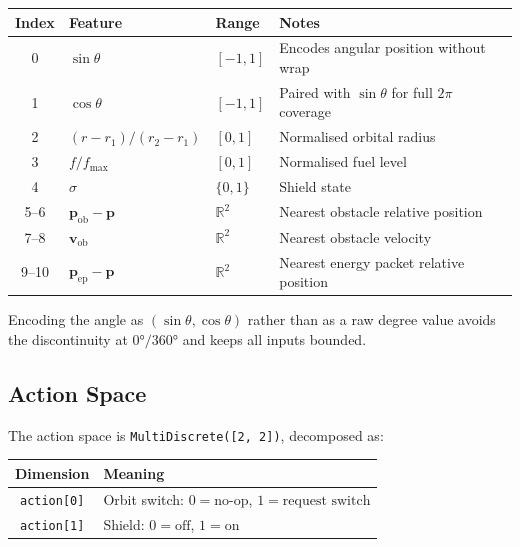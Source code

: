 \documentclass[12pt]{article}
\begin{document}
\begin{center}
    \renewcommand{\arraystretch}{1.3}
    \begin{tabular}{clll}
        \toprule
        Index & Feature                               & Range          & Notes                                             \\
        \midrule
        0     & $\sin\theta$                          & $[-1, 1]$      & Encodes angular position without wrap             \\
        1     & $\cos\theta$                          & $[-1, 1]$      & Paired with $\sin\theta$ for full $2\pi$ coverage \\
        2     & $(r - r_1)/(r_2 - r_1)$               & $[0, 1]$       & Normalised orbital radius                         \\
        3     & $f / f_{\max}$                        & $[0, 1]$       & Normalised fuel level                             \\
        4     & $\sigma$                              & $\{0, 1\}$     & Shield state                                      \\
        5--6  & $\mathbf{p}_{\text{ob}} - \mathbf{p}$ & $\mathbb{R}^2$ & Nearest obstacle relative position                \\
        7--8  & $\mathbf{v}_{\text{ob}}$              & $\mathbb{R}^2$ & Nearest obstacle velocity                         \\
        9--10 & $\mathbf{p}_{\text{ep}} - \mathbf{p}$ & $\mathbb{R}^2$ & Nearest energy packet relative position           \\
        \bottomrule
    \end{tabular}
\end{center}

\noindent Encoding the angle as $(\sin\theta, \cos\theta)$ rather than as a raw degree value avoids the discontinuity at $0°/360°$ and keeps all inputs bounded.

\subsection{Action Space}

The action space is \texttt{MultiDiscrete([2, 2])}, decomposed as:

\begin{center}
    \renewcommand{\arraystretch}{1.3}
    \begin{tabular}{cl}
        \toprule
        Dimension          & Meaning                                                       \\
        \midrule
        \texttt{action[0]} & Orbit switch: $0 = \text{no-op}$, $1 = \text{request switch}$ \\
        \texttt{action[1]} & Shield: $0 = \text{off}$, $1 = \text{on}$                     \\
        \bottomrule
    \end{tabular}
\end{center}
\end{document}
